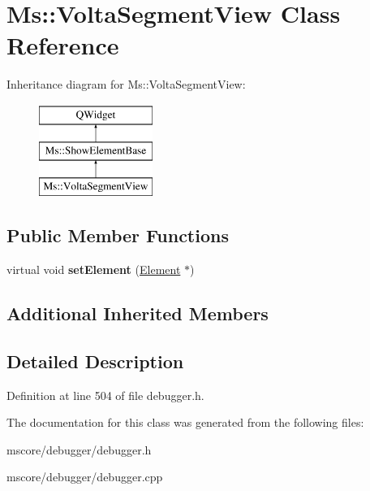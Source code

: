 \hypertarget{class_ms_1_1_volta_segment_view}{}\section{Ms\+:\+:Volta\+Segment\+View Class Reference}
\label{class_ms_1_1_volta_segment_view}
Inheritance diagram for Ms\+:\+:Volta\+Segment\+View\+:\begin{figure}[H]
\begin{center}
\leavevmode
\includegraphics[height=3.000000cm]{class_ms_1_1_volta_segment_view}
\end{center}
\end{figure}
\subsection*{Public Member Functions}
\begin{DoxyCompactItemize}
\item 
\mbox{\label{class_ms_1_1_volta_segment_view_a30bd659b8caea63571ec5e9e1533b076}} 
virtual void {\bfseries set\+Element} (\hyperlink{class_ms_1_1_element}{Element} $\ast$)
\end{DoxyCompactItemize}
\subsection*{Additional Inherited Members}


\subsection{Detailed Description}


Definition at line 504 of file debugger.\+h.



The documentation for this class was generated from the following files\+:\begin{DoxyCompactItemize}
\item 
mscore/debugger/debugger.\+h\item 
mscore/debugger/debugger.\+cpp\end{DoxyCompactItemize}
